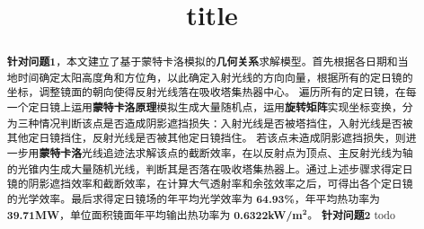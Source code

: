 \documentclass{myclass}
\title{title}
\begin{document}
\begin{abstract}
\textbf{针对问题1}，本文建立了基于蒙特卡洛模拟的\textbf{几何关系}求解模型。首先根据各日期和当地时间确定太阳高度角和方位角，以此确定入射光线的方向向量，根据所有的定日镜的坐标，调整镜面的朝向使得反射光线落在吸收塔集热器中心。
遍历所有的定日镜，在每一个定日镜上运用\textbf{蒙特卡洛原理}模拟生成大量随机点，运用\textbf{旋转矩阵}实现坐标变换，分为三种情况判断该点是否造成阴影遮挡损失：入射光线是否被塔挡住，入射光线是否被其他定日镜挡住，反射光线是否被其他定日镜挡住。
若该点未造成阴影遮挡损失，则进一步用\textbf{蒙特卡洛}光线追迹法求解该点的截断效率，在以反射点为顶点、主反射光线为轴的光锥内生成大量随机光线，判断其是否落在吸收塔集热器上。通过上述步骤求得定日镜的阴影遮挡效率和截断效率，在计算大气透射率和余弦效率之后，可得出各个定日镜的光学效率。最后求得定日镜场的年平均光学效率为 \textbf{64.93\%}，年平均热功率为 \textbf{39.71MW}，单位面积镜面年平均输出热功率为 \textbf{0.6322kW/m}\({}^{\mathbf{2}}\)。
\textbf{针对问题2}
todo
\end{abstract}







\end{document}
